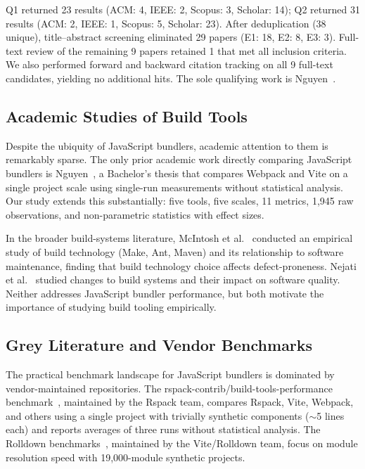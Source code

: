 \documentclass[preprint,12pt]{elsarticle}
\begin{document}
Q1 returned 23 results (ACM: 4, IEEE: 2, Scopus: 3, Scholar: 14); Q2 returned 31 results (ACM: 2, IEEE: 1, Scopus: 5, Scholar: 23).
After deduplication (38 unique), title--abstract screening eliminated 29 papers (E1: 18, E2: 8, E3: 3).
Full-text review of the remaining 9 papers retained 1 that met all inclusion criteria.
We also performed forward and backward citation tracking on all 9 full-text candidates, yielding no additional hits.
The sole qualifying work is Nguyen~\cite{nguyen2024comparative}.

\subsection{Academic Studies of Build Tools}

Despite the ubiquity of JavaScript bundlers, academic attention to them is remarkably sparse.
The only prior academic work directly comparing JavaScript bundlers is Nguyen~\cite{nguyen2024comparative}, a Bachelor's thesis that compares Webpack and Vite on a single project scale using single-run measurements without statistical analysis.
Our study extends this substantially: five tools, five scales, 11 metrics, 1{,}945 raw observations, and non-parametric statistics with effect sizes.

In the broader build-systems literature, McIntosh et al.~\cite{mcintosh2015build} conducted an empirical study of build technology (Make, Ant, Maven) and its relationship to software maintenance, finding that build technology choice affects defect-proneness.
Nejati et al.~\cite{nejati2024understanding} studied changes to build systems and their impact on software quality.
Neither addresses JavaScript bundler performance, but both motivate the importance of studying build tooling empirically.

\subsection{Grey Literature and Vendor Benchmarks}

The practical benchmark landscape for JavaScript bundlers is dominated by vendor-maintained repositories.
The rspack-contrib/build-tools-performance benchmark~\cite{rspackbench2026}, maintained by the Rspack team, compares Rspack, Vite, Webpack, and others using a single project with trivially synthetic components ($\sim$5 lines each) and reports averages of three runs without statistical analysis.
The Rolldown benchmarks~\cite{rolldownbench2026}, maintained by the Vite/Rolldown team, focus on module resolution speed with 19{,}000-module synthetic projects.
\end{document}

